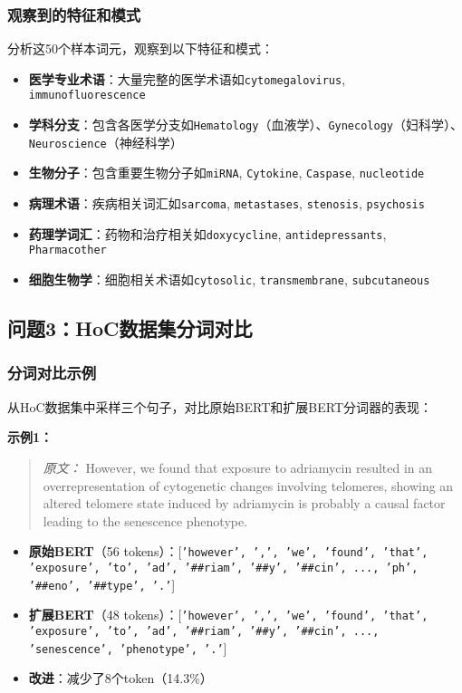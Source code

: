 \documentclass[12pt,letterpaper]{article}
\begin{document}
\subsubsection{观察到的特征和模式}

分析这50个样本词元，观察到以下特征和模式：

\begin{itemize}
    \item \textbf{医学专业术语}：大量完整的医学术语如\texttt{cytomegalovirus}, \texttt{immunofluorescence}
    \item \textbf{学科分支}：包含各医学分支如\texttt{Hematology}（血液学）、\texttt{Gynecology}（妇科学）、\texttt{Neuroscience}（神经科学）
    \item \textbf{生物分子}：包含重要生物分子如\texttt{miRNA}, \texttt{Cytokine}, \texttt{Caspase}, \texttt{nucleotide}
    \item \textbf{病理术语}：疾病相关词汇如\texttt{sarcoma}, \texttt{metastases}, \texttt{stenosis}, \texttt{psychosis}
    \item \textbf{药理学词汇}：药物和治疗相关如\texttt{doxycycline}, \texttt{antidepressants}, \texttt{Pharmacother}
    \item \textbf{细胞生物学}：细胞相关术语如\texttt{cytosolic}, \texttt{transmembrane}, \texttt{subcutaneous}
\end{itemize}

\subsection{问题3：HoC数据集分词对比}

\subsubsection{分词对比示例}

从HoC数据集中采样三个句子，对比原始BERT和扩展BERT分词器的表现：

\textbf{示例1：}
\begin{quote}
\textit{原文：} However, we found that exposure to adriamycin resulted in an overrepresentation of cytogenetic changes involving telomeres, showing an altered telomere state induced by adriamycin is probably a causal factor leading to the senescence phenotype.
\end{quote}

\begin{itemize}
    \item \textbf{原始BERT}（56 tokens）：[\texttt{'however', ',', 'we', 'found', 'that', 'exposure', 'to', 'ad', '\#\#riam', '\#\#y', '\#\#cin', ..., 'ph', '\#\#eno', '\#\#type', '.'}]
    \item \textbf{扩展BERT}（48 tokens）：[\texttt{'however', ',', 'we', 'found', 'that', 'exposure', 'to', 'ad', '\#\#riam', '\#\#y', '\#\#cin', ..., 'senescence', 'phenotype', '.'}]
    \item \textbf{改进}：减少了8个token（14.3\%）
\end{itemize}
\end{document}
